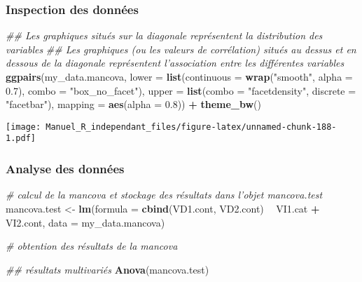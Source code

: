 \documentclass[
]{book}
\newenvironment{Shaded}{\begin{snugshade}}{\end{snugshade}}
\newcommand{\CommentTok}[1]{\textcolor[rgb]{0.56,0.35,0.01}{\textit{#1}}}
\newcommand{\DataTypeTok}[1]{\textcolor[rgb]{0.13,0.29,0.53}{#1}}
\newcommand{\FloatTok}[1]{\textcolor[rgb]{0.00,0.00,0.81}{#1}}
\newcommand{\KeywordTok}[1]{\textcolor[rgb]{0.13,0.29,0.53}{\textbf{#1}}}
\newcommand{\NormalTok}[1]{#1}
\newcommand{\OperatorTok}[1]{\textcolor[rgb]{0.81,0.36,0.00}{\textbf{#1}}}
\newcommand{\StringTok}[1]{\textcolor[rgb]{0.31,0.60,0.02}{#1}}
\begin{document}
\hypertarget{inspection-des-donnuxe9es-21}{%
\subsubsection{Inspection des données}\label{inspection-des-donnuxe9es-21}}

\begin{Shaded}
\begin{Highlighting}[]
\CommentTok{## Les graphiques situés sur la diagonale représentent la distribution des variables}
\CommentTok{## Les graphiques (ou les valeurs de corrélation) situés au dessus et en dessous de la diagonale représentent l'association entre les différentes variables}
\KeywordTok{ggpairs}\NormalTok{(my_data.mancova,}
        \DataTypeTok{lower =} \KeywordTok{list}\NormalTok{(}\DataTypeTok{continuous =} \KeywordTok{wrap}\NormalTok{(}\StringTok{"smooth"}\NormalTok{, }\DataTypeTok{alpha =} \FloatTok{0.7}\NormalTok{), }\DataTypeTok{combo =} \StringTok{"box_no_facet"}\NormalTok{),}
        \DataTypeTok{upper =} \KeywordTok{list}\NormalTok{(}\DataTypeTok{combo =} \StringTok{"facetdensity"}\NormalTok{, }\DataTypeTok{discrete =} \StringTok{"facetbar"}\NormalTok{), }
        \DataTypeTok{mapping =} \KeywordTok{aes}\NormalTok{(}\DataTypeTok{alpha =} \FloatTok{0.8}\NormalTok{)) }\OperatorTok{+}\StringTok{ }\KeywordTok{theme_bw}\NormalTok{()}
\end{Highlighting}
\end{Shaded}

\texttt{[image: Manuel\_R\_independant\_files/figure-latex/unnamed-chunk-188-1.pdf]}

\hypertarget{analyse-des-donnuxe9es-22}{%
\subsubsection{Analyse des données}\label{analyse-des-donnuxe9es-22}}

\begin{Shaded}
\begin{Highlighting}[]
\CommentTok{# calcul de la mancova et stockage des résultats dans l’objet mancova.test}
\NormalTok{mancova.test <-}\StringTok{ }\KeywordTok{lm}\NormalTok{(}\DataTypeTok{formula =} \KeywordTok{cbind}\NormalTok{(VD1.cont, VD2.cont) }\OperatorTok{~}\StringTok{ }\NormalTok{VI1.cat }\OperatorTok{+}\StringTok{ }\NormalTok{VI2.cont,}
                 \DataTypeTok{data =}\NormalTok{ my_data.mancova)}

\CommentTok{# obtention des résultats de la mancova}

\CommentTok{## résultats multivariés }
\KeywordTok{Anova}\NormalTok{(mancova.test)}
\end{Highlighting}
\end{Shaded}
\end{document}

